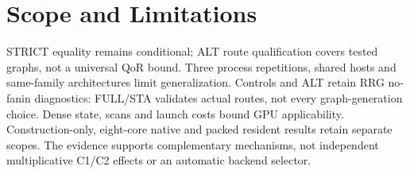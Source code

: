 \section{Scope and Limitations}
STRICT equality remains conditional; ALT route qualification covers tested graphs, not a universal QoR bound. Three process repetitions, shared hosts and same-family architectures limit generalization. Controls and ALT retain RRG no-fanin diagnostics: FULL/STA validates actual routes, not every graph-generation choice. Dense state, scans and launch costs bound GPU applicability. Construction-only, eight-core native and packed resident results retain separate scopes. The evidence supports complementary mechanisms, not independent multiplicative C1/C2 effects or an automatic backend selector.
